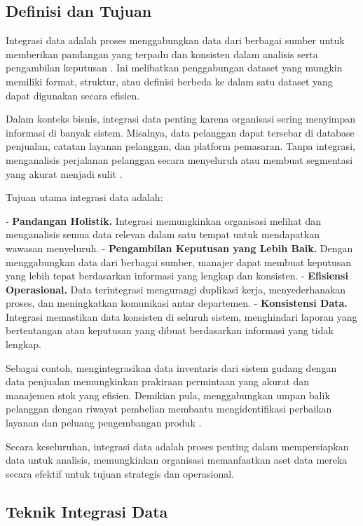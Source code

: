\subsection{Definisi dan Tujuan}


Integrasi data adalah proses menggabungkan data dari berbagai sumber untuk memberikan pandangan yang terpadu dan konsisten dalam analisis serta pengambilan keputusan \cite{lenzerini2002data}. Ini melibatkan penggabungan dataset yang mungkin memiliki format, struktur, atau definisi berbeda ke dalam satu dataset yang dapat digunakan secara efisien.

Dalam konteks bisnis, integrasi data penting karena organisasi sering menyimpan informasi di banyak sistem. Misalnya, data pelanggan dapat tersebar di database penjualan, catatan layanan pelanggan, dan platform pemasaran. Tanpa integrasi, menganalisis perjalanan pelanggan secara menyeluruh atau membuat segmentasi yang akurat menjadi sulit \cite{doan2012principles}.

Tujuan utama integrasi data adalah:

- \textbf{Pandangan Holistik.} Integrasi memungkinkan organisasi melihat dan menganalisis semua data relevan dalam satu tempat untuk mendapatkan wawasan menyeluruh.
- \textbf{Pengambilan Keputusan yang Lebih Baik.} Dengan menggabungkan data dari berbagai sumber, manajer dapat membuat keputusan yang lebih tepat berdasarkan informasi yang lengkap dan konsisten.
- \textbf{Efisiensi Operasional.} Data terintegrasi mengurangi duplikasi kerja, menyederhanakan proses, dan meningkatkan komunikasi antar departemen.
- \textbf{Konsistensi Data.} Integrasi memastikan data konsisten di seluruh sistem, menghindari laporan yang bertentangan atau keputusan yang dibuat berdasarkan informasi yang tidak lengkap.

Sebagai contoh, mengintegrasikan data inventaris dari sistem gudang dengan data penjualan memungkinkan prakiraan permintaan yang akurat dan manajemen stok yang efisien. Demikian pula, menggabungkan umpan balik pelanggan dengan riwayat pembelian membantu mengidentifikasi perbaikan layanan dan peluang pengembangan produk \cite{hernandez1995merge}.

Secara keseluruhan, integrasi data adalah proses penting dalam mempersiapkan data untuk analisis, memungkinkan organisasi memanfaatkan aset data mereka secara efektif untuk tujuan strategis dan operasional.

\subsection{Teknik Integrasi Data}

